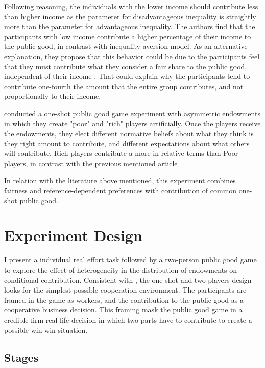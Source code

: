 \documentclass[a4paper, 12pt]{article}
\begin{document}
Following \cite{Fehr1999} reasoning, the individuals with the lower income should contribute less than higher income as the parameter for disadvantageous inequality is straightly more than the parameter for advantageous inequality. The authors find that the participants with low income contribute a higher percentage of their income to the public good, in contrast with inequality-aversion \cite{ Fehr1999} model. As an alternative explanation, they propose that this behavior could be due to the participants feel that they must contribute what they consider a fair share to the public good, independent of their income \citep{Sugden1984}. That could explain why the participants tend to contribute one-fourth the amount that the entire group contributes, and not proportionally to their income.

\cite{Spiller2016} conducted a one-shot public good game experiment with asymmetric endowments in which they create "poor" and "rich" players artificially. Once the players receive the endowments, they elect different normative beliefs about what they think is they right amount to contribute, and different expectations about what others will contribute. Rich players contribute a more in relative terms than Poor players, in contrast with the previous mentioned article \citep{BUCKLEY2006}

In relation with the literature above mentioned, this experiment combines fairness and reference-dependent preferences with contribution of common one-shot public good.

\section{Experiment Design}

I present a individual real effort task followed by a two-person public good game to explore the effect of heterogeneity in the distribution of endowments on conditional contribution. Consistent with \cite{OXOBY2013}, the one-shot and two players design looks for the simplest possible cooperation environment. The participants are framed in the game as workers, and the contribution to the public good as a cooperative business decision. This framing mask the public good game in a credible firm real-life decision in which two parts have to contribute to create a possible win-win situation.

\subsection{Stages}
\end{document}
